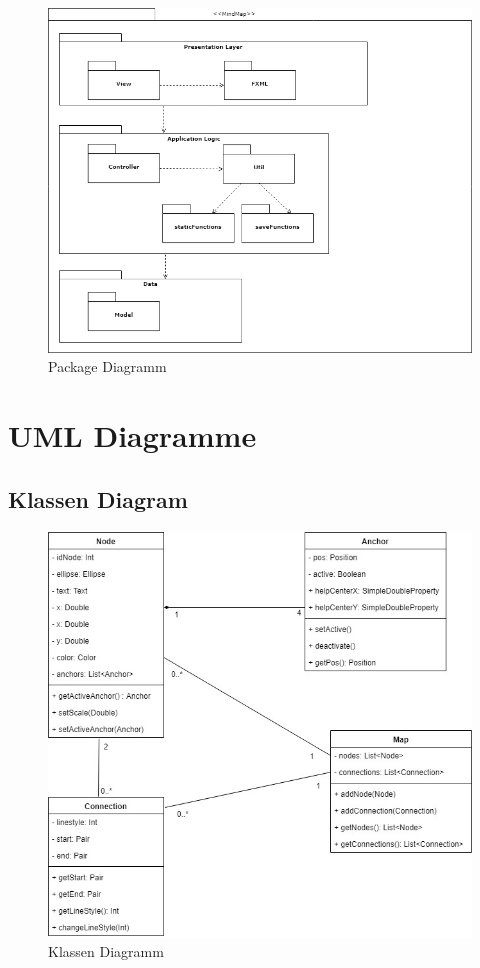 \begin{figure}[H]
	\centering
		\includegraphics[width=\textwidth]{images/packagediagramm.png}
	\caption{Package Diagramm}
	\label{fig:loadConvert_SD}
\end{figure}


\section{UML Diagramme}
\label{sec:uml_diagramme}

\subsection{Klassen Diagram}
\label{subsec:class_diagramm}
\begin{figure}[H]
	\centering
		\includegraphics[scale=0.5]{images/class_diagramm.png}
	\caption{Klassen Diagramm}
	\label{fig:class_diagramm}
\end{figure}

